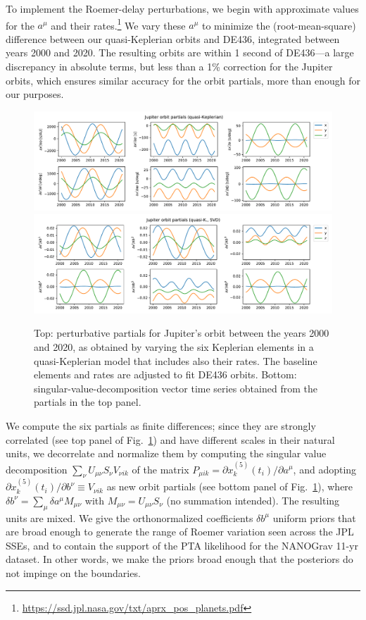 \documentclass[iop,apj,twocolappendix]{emulateapj}
\begin{document}
\begin{itemize}
To implement the Roemer-delay perturbations, we begin with approximate values for the $a^\mu$ and their rates.\footnote{\href{https://ssd.jpl.nasa.gov/txt/aprx_pos_planets.pdf}{https://ssd.jpl.nasa.gov/txt/aprx\_pos\_planets.pdf}}
We vary these $a^\mu$ to minimize the (root-mean-square) difference between our quasi-Keplerian orbits and DE436, integrated between years 2000 and 2020. The resulting orbits are within 1 second of DE436---a large discrepancy in absolute terms, but less than a 1\% correction for the Jupiter orbits, which ensures similar accuracy for the orbit partials, more than enough for our purposes.
%
\begin{figure}[t]
    \centering
    \includegraphics[width=2\columnwidth]{figures/JupiterPartials.pdf}
    \includegraphics[width=2\columnwidth]{figures/JupiterPartialsSVD.pdf}
    \caption{Top: perturbative partials for Jupiter's orbit between the years 2000 and 2020, as obtained by varying the six Keplerian elements in a quasi-Keplerian model that includes also their rates. The baseline elements and rates are adjusted to fit DE436 orbits. Bottom: singular-value-decomposition vector time series obtained from the partials in the top panel.}
    \label{fig:jupiterorbit}
\end{figure}

We compute the six partials as finite differences; since they are strongly correlated (see top panel of Fig.\ \ref{fig:jupiterorbit}) and have different scales in their natural units, we decorrelate and normalize them by computing the singular value decomposition $\sum_\nu U_{\mu\nu} S_\nu V_{\nu i k}$ of the matrix $P_{\mu i k} = \partial x^{(5)}_k(t_i)/\partial a^\mu$, and adopting $\partial x^{(5)}_k(t_i)/\partial b^\nu \equiv V_{\nu i k}$ as new orbit partials (see bottom panel of Fig.\ \ref{fig:jupiterorbit}), where $\delta b^\nu = \sum_\mu \delta a^\mu M_{\mu \nu}$ with $M_{\mu \nu} = U_{\mu\nu} S_\nu$ (no summation intended). The resulting units are mixed. We give the orthonormalized coefficients $\delta b^\mu$ uniform priors that are broad enough to generate the range of Roemer variation seen across the JPL SSEs, and to contain the support of the PTA likelihood for the NANOGrav 11-yr dataset. In other words, we make the priors broad enough that the posteriors do not impinge on the boundaries.


\end{itemize}
\end{document}
